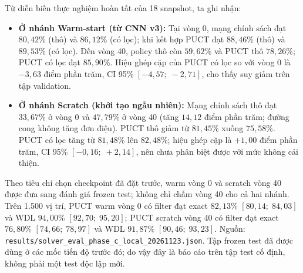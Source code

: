 \documentclass[11pt, a4paper]{article}
\begin{document}
Từ diễn biến thực nghiệm hoàn tất của 18 snapshot, ta ghi nhận:
\begin{itemize}
    \item \textbf{Ở nhánh Warm-start (từ CNN v3):} Tại vòng 0, mạng chính sách đạt $80{,}42\%$ (thô) và $86{,}12\%$ (có lọc); khi kết hợp PUCT đạt $88{,}46\%$ (thô) và $89{,}53\%$ (có lọc). Đến vòng 40, policy thô còn $59{,}62\%$ và PUCT thô $78{,}26\%$; PUCT có lọc đạt $85{,}90\%$. Hiệu ghép cặp của PUCT có lọc so với vòng 0 là $-3{,}63$ điểm phần trăm, CI 95\% $[-4{,}57;\; -2{,}71]$, cho thấy suy giảm trên tập validation.
    \item \textbf{Ở nhánh Scratch (khởi tạo ngẫu nhiên):} Mạng chính sách thô đạt $33{,}67\%$ ở vòng 0 và $47{,}79\%$ ở vòng 40 (tăng $14{,}12$ điểm phần trăm; đường cong không tăng đơn điệu). PUCT thô giảm từ $81{,}45\%$ xuống $75{,}58\%$. PUCT có lọc tăng từ $81{,}48\%$ lên $82{,}48\%$; hiệu ghép cặp là $+1{,}00$ điểm phần trăm, CI 95\% $[-0{,}16;\; +2{,}14]$, nên chưa phân biệt được với mức không cải thiện.
\end{itemize}

Theo tiêu chí chọn checkpoint đã đặt trước, warm vòng 0 và scratch vòng 40 được đưa sang đánh giá frozen test; không chỉ chấm vòng 40 cho cả hai nhánh. Trên 1.500 vị trí, PUCT warm vòng 0 có filter đạt exact $82{,}13\%$ $[80{,}14;\; 84{,}03]$ và WDL $94{,}00\%$ $[92{,}70;\; 95{,}20]$; PUCT scratch vòng 40 có filter đạt exact $76{,}80\%$ $[74{,}66;\; 78{,}97]$ và WDL $91{,}87\%$ $[90{,}46;\; 93{,}23]$. Nguồn: \texttt{results/solver\_eval\_phase\_c\_local\_20261123.json}. Tập frozen test đã được dùng ở các mốc tiến độ trước đó; do vậy đây là báo cáo trên tập test cố định, không phải một test độc lập mới.
\end{document}
